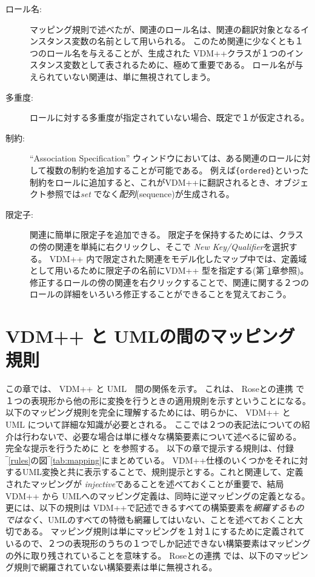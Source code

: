 \documentclass[\pformat,12pt]{jarticle}
\newcommand{\vdmpp}{VDM++}
\newcommand{\link}{Roseとの連携}
\begin{document}
\begin{itemize}
\begin{description}
\item [ロール名:] マッピング規則で述べたが、関連のロール名は、関連の翻訳対象となるインスタンス変数の名前として用いられる。
このため関連に少なくとも１つのロール名を与えることが、生成された \vdmpp{}クラスが１つのインスタンス変数として表されるために、極めて重要である。
ロール名が与えられていない関連は、単に無視されてしまう。
\item [多重度:] ロールに対する多重度が指定されていない場合、既定で１が仮定される。
\item [制約:]  ``Association Specification'' ウィンドウにおいては、ある関連のロールに対して複数の制約を追加することが可能である。
例えば{\tt \{ordered\}}といった制約をロールに追加すると、これが\vdmpp{}に翻訳されるとき、オブジェクト参照では{\it set} でなく{\it 配列}(sequence)が生成される。
\item [限定子:] 関連に簡単に限定子を追加できる。
  限定子を保持するためには、クラスの傍の関連を単純に右クリックし、そこで {\em New Key/Qualifier}を選択する。
\vdmpp{} 内で限定された関連をモデル化したマップ中では、定義域として用いるために限定子の名前に\vdmpp{} 型を指定する(第‾\ref{mapping}章参照)。
修正するロールの傍の関連を右クリックすることで、関連に関する２つのロールの詳細をいろいろ修正することができることを覚えておこう。
\end{description}  

\end{itemize}
  
\newpage  
\section{VDM++ と UMLの間のマッピング規則} \label{mapping}
  
この章では、 \vdmpp{} と UML　間の関係を示す。
これは、 \link{} で１つの表現形から他の形に変換を行うときの適用規則を示すということになる。
以下のマッピング規則を完全に理解するためには、明らかに、 \vdmpp{}  と UML について詳細な知識が必要とされる。
ここでは２つの表記法についての紹介は行わないで、必要な場合は単に様々な構築要素について述べるに留める。
完全な提示を行うために \cite{LangManPP-CSK} と \cite{Booch&97} を参照する。
以下の章で提示する規則は、付録‾\ref{rules}の図‾\ref{tab:mapping}にまとめている。
 \vdmpp{}仕様のいくつかをそれに対するUML変換と共に表示することで、規則提示とする。これと関連して、定義されたマッピングが {\it  injective}であることを述べておくことが重要で、結局 \vdmpp{} から UMLへのマッピング定義は、同時に逆マッピングの定義となる。
更には、以下の規則は \vdmpp{}で記述できるすべての構築要素を{\it 網羅するものではなく}、UMLのすべての特徴も網羅してはいない、ことを述べておくこと大切である。
マッピング規則は単にマッピングを１対１にするために定義されているので、２つの表現形のうちの１つでしか記述できない構築要素はマッピングの外に取り残されていることを意味する。
 \link{} では、以下のマッピング規則で網羅されていない構築要素は単に無視される。
\end{document}
